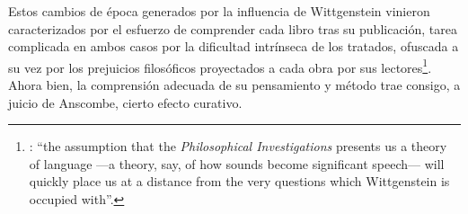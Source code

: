 Estos cambios de época generados por la influencia de Wittgenstein vinieron caracterizados por el esfuerzo de comprender cada libro tras su publicación, tarea complicada en ambos casos por la dificultad intrínseca de los tratados, ofuscada a su vez por los prejuicios filosóficos proyectados a cada obra por sus lectores\footnote{\cite[Cf.][183]{anscombe2011plato:twocuts}: \enquote{the assumption that the \emph{Philosophical Investigations} presents us a theory of language ---a theory, say, of how sounds become significant speech--- will quickly place us at a distance from the very questions which Wittgenstein is occupied with}.}.
Ahora bien, la comprensión adecuada de su pensamiento y método trae consigo, a juicio de Anscombe, cierto efecto curativo.



